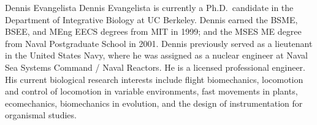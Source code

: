 \documentclass[journal]{IEEEtran}
\begin{document}
\ifCLASSOPTIONcaptionsoff
  \newpage
\fi




\nocite{Mueller:2002}













% 


\begin{IEEEbiography}{Dennis Evangelista}
Dennis Evangelista is currently a Ph.D.\ candidate in the Department of Integrative Biology at UC Berkeley.  Dennis earned the BSME, BSEE, and MEng EECS degrees from MIT in 1999; and the MSES ME degree from Naval Postgraduate School in 2001.  Dennis previously served as a lieutenant in the United States Navy, where he was assigned as a nuclear engineer at Naval Sea Systems Command / Naval Reactors. He is a licensed professional engineer. His current biological research interests include flight biomechanics, locomotion and control of locomotion in variable environments, fast movements in plants, ecomechanics, biomechanics in evolution, and the design of instrumentation for organismal studies.  
\end{IEEEbiography}
\end{document}
